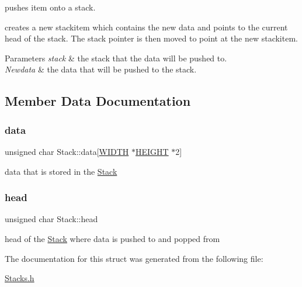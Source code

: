 pushes item onto a stack. 

creates a new stackitem which contains the new data and points to the current head of the stack. The stack pointer is then moved to point at the new stackitem.


\begin{DoxyParams}{Parameters}
{\em stack} & the stack that the data will be pushed to. \\
\hline
{\em Newdata} & the data that will be pushed to the stack. \\
\hline
\end{DoxyParams}


\subsection{Member Data Documentation}
\mbox{\label{structStack_af7c19f315867ae89b59eb06bb1e6c8bf}} 
\subsubsection{\texorpdfstring{data}{data}}
{\footnotesize\ttfamily unsigned char Stack\+::data\mbox{[}\hyperlink{MappingFunctions_8h_a241aeeb764887ae5e3de58b98f04b16d}{W\+I\+D\+TH} $\ast$\hyperlink{MappingFunctions_8h_aed89bd71aee8be823e8a20ec4e093c1e}{H\+E\+I\+G\+HT} $\ast$2\mbox{]}}

data that is stored in the \hyperlink{structStack}{Stack} \mbox{\label{structStack_ae9de4145f4aee2664247e585ec86d220}} 
\subsubsection{\texorpdfstring{head}{head}}
{\footnotesize\ttfamily unsigned char Stack\+::head}

head of the \hyperlink{structStack}{Stack} where data is pushed to and popped from 

The documentation for this struct was generated from the following file\+:\begin{DoxyCompactItemize}
\item 
\hyperlink{Stacks_8h}{Stacks.\+h}\end{DoxyCompactItemize}
